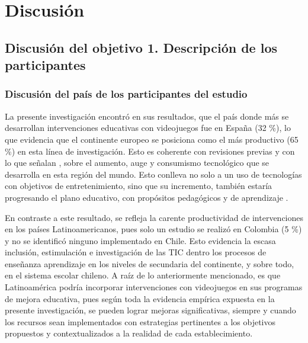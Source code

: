 \documentclass[spanish]{textolivre}
\begin{document}
\section{Discusión}\label{sec-links}

\subsection{Discusión del objetivo 1. Descripción de los participantes}

\subsubsection{Discusión del país de los participantes del estudio}
La presente investigación encontró en sus resultados, que el país donde más se desarrollan intervenciones educativas con videojuegos fue en España (32 \%), lo que evidencia que el continente europeo se posiciona como el más productivo (65 \%) en esta línea de investigación. Esto es coherente con revisiones previas \cite{gonzalez-sancho_estado_2019,baranowski_descriptive_2020} y con lo que señalan \textcite{aznar_diaz_tecnologimovil_2018,maraza_quispe_efectos_2018,collado_sector_2018}, sobre el aumento, auge y consumismo tecnológico que se desarrolla en esta región del mundo. Esto conlleva no solo a un uso de tecnologías con objetivos de entretenimiento, sino que su incremento, también estaría progresando el plano educativo, con propósitos pedagógicos y de aprendizaje \cite{nunez-barriopedro_videojuegos_2020}. 

En contraste a este resultado, se refleja la carente productividad de intervenciones en los países Latinoamericanos, pues solo un estudio se realizó en Colombia (5 \%) y no se identificó ninguno implementado en Chile. Esto evidencia la escasa inclusión, estimulación e investigación de las TIC dentro los procesos de enseñanza aprendizaje en los niveles de secundaria del continente, y sobre todo, en el sistema escolar chileno. A raíz de lo anteriormente mencionado, es que Latinoamérica podría incorporar intervenciones con videojuegos en sus programas de mejora educativa, pues según toda la evidencia empírica expuesta en la presente investigación, se pueden lograr mejoras significativas, siempre y cuando los recursos sean implementados con estrategias pertinentes a los objetivos propuestos y contextualizados a la realidad de cada establecimiento. 
\end{document}

